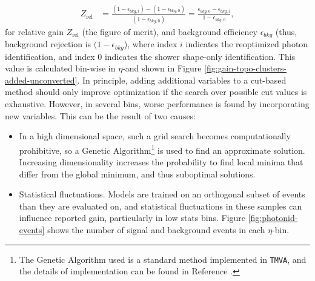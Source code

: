 \begin{align}
    Z_{\text{rel}} &= \frac{(1-\epsilon_{bkg,i}) - (1-\epsilon_{bkg,0})}{(1-\epsilon_{bkg,0})} = \frac{\epsilon_{bkg,0} - \epsilon_{bkg,i}}{1-\epsilon_{bkg,0}},
    \label{eqn:improvement-metric}
\end{align}
for relative gain $Z_{\text{rel}}$ (the figure of merit), and background efficiency $\epsilon_{bkg}$ (thus, background rejection is $(1-\epsilon_{bkg}$), where index $i$ indicates the reoptimized photon identification, and index $0$ indicates the shower shape-only identification. This value is calculated bin-wise in $\eta$-\pt and shown in Figure \ref{fig:gain-topo-clusters-added-unconverted}. In principle, adding additional variables to a cut-based method should only improve optimization if the search over possible cut values is exhaustive. However, in several bins, worse performance is found by incorporating new variables. This can be the result of two causes:
\begin{itemize}
    \item In a high dimensional space, such a grid search becomes computationally prohibitive, so a Genetic Algorithm\footnote{The Genetic Algorithm used is a standard method implemented in \texttt{TMVA}, and the details of implementation can be found in Reference \cite{TMVA}.} \cite{genetic-algo} is used to find an approximate solution. Increasing dimensionality increases the probability to find local minima that differ from the global minimum, and thus suboptimal solutions.
    \item Statistical fluctuations. Models are trained on an orthogonal subset of events than they are evaluated on, and statistical fluctuations in these samples can influence reported gain, particularly in low stats bins. Figure \ref{fig:photonid-events} shows the number of signal and background events in each $\eta$-\pt bin.
\end{itemize}
